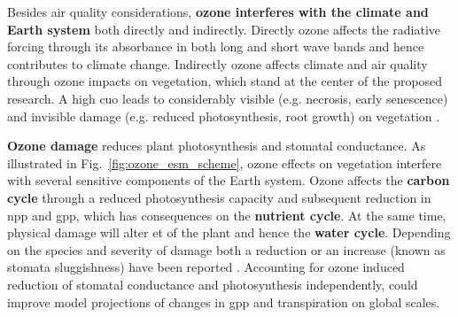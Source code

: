 Besides air quality considerations, \textbf{ozone interferes with the climate and Earth system} both directly and indirectly. Directly ozone affects the radiative forcing through its absorbance in both long and short wave bands and hence contributes to climate change. Indirectly ozone affects climate and air quality through ozone impacts on vegetation, which stand at the center of the proposed research. A high \gls{cuo} leads to considerably visible (e.g. necrosis, early senescence) and invisible damage (e.g. reduced photosynthesis, root growth) on vegetation \parencite{GCB:Mills2010}.

\textbf{\color{red}Ozone damage} reduces plant photosynthesis and stomatal conductance. As illustrated in Fig.~\ref{fig:ozone_esm_scheme}, ozone effects on vegetation interfere with several sensitive components of the Earth system. Ozone affects the \textbf{\color{darkgray}carbon cycle} through a reduced photosynthesis capacity and subsequent reduction in \gls{npp} and \gls{gpp}, which has consequences on the \textbf{\color{darkgray}nutrient cycle}. At the same time, physical damage will alter \gls{et} of the plant and hence the \textbf{\color{blue}water cycle}. Depending on the species and severity of damage both a reduction \parencite{Oe:Lombardozzi2012} or an increase (known as stomata sluggishness) have been reported \parencite{SR:Hoshika2015}. Accounting for ozone induced reduction of stomatal conductance and photosynthesis independently, \textcite{BGS:Lombardozzi2012} could improve model projections of changes in \gls{gpp} and transpiration on global scales.

